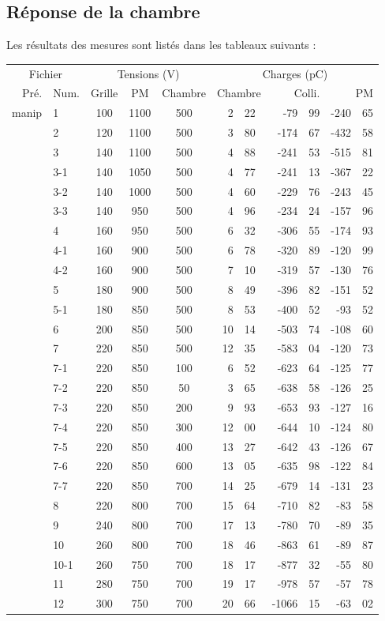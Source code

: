 \documentclass[a4paper,11pt]{article}
\begin{document}
\subsection*{Réponse de la chambre}

Les résultats des mesures sont listés dans les tableaux suivants :
\begin{center}
\begin{tabular}{rl|ccc|r@{.}lr@{.}lr@{.}l}
\multicolumn{2}{c|}{Fichier}&\multicolumn{3}{c|}{Tensions (V)}&\multicolumn{6}{c}{Charges (pC)}\\
Pré.&Num.&Grille&PM&Chambre&\multicolumn{2}{r}{Chambre}&\multicolumn{2}{r}{Colli.}&\multicolumn{2}{r}{PM}\\
\hline
\hline
manip&1&100&1100&500&\hspace*{3ex}2&22&-79&99&-240&65\\
&2&120&1100&500&3&80&-174&67&-432&58\\
&3&140&1100&500&4&88&-241&53&-515&81\\
&3-1&140&1050&500&4&77&-241&13&-367&22\\
&3-2&140&1000&500&4&60&-229&76&-243&45\\
&3-3&140&950&500&4&96&-234&24&-157&96\\
&4&160&950&500&6&32&-306&55&-174&93\\
&4-1&160&900&500&6&78&-320&89&-120&99\\
&4-2&160&900&500&7&10&-319&57&-130&76\\
&5&180&900&500&8&49&-396&82&-151&52\\
&5-1&180&850&500&8&53&-400&52&-93&52\\
&6&200&850&500&10&14&-503&74&-108&60\\
&7&220&850&500&12&35&-583&04&-120&73\\
&7-1&220&850&100&6&52&-623&64&-125&77\\
&7-2&220&850&50&3&65&-638&58&-126&25\\
&7-3&220&850&200&9&93&-653&93&-127&16\\
&7-4&220&850&300&12&00&-644&10&-124&80\\
&7-5&220&850&400&13&27&-642&43&-126&67\\
&7-6&220&850&600&13&05&-635&98&-122&84\\
&7-7&220&850&700&14&25&-679&14&-131&23\\
&8&220&800&700&15&64&-710&82&-83&58\\
&9&240&800&700&17&13&-780&70&-89&35\\
&10&260&800&700&18&46&-863&61&-89&87\\
&10-1&260&750&700&18&17&-877&32&-55&80\\
&11&280&750&700&19&17&-978&57&-57&78\\
&12&300&750&700&20&66&-1066&15&-63&02\\
\hline
\end{tabular}
\end{center}
\end{document}
